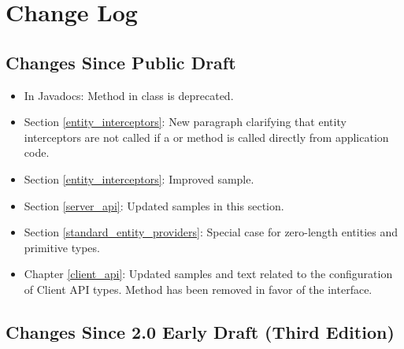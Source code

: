 \chapter{Change Log}

\section{Changes Since Public Draft}

\begin{itemize}
\item In Javadocs: Method  in class  is deprecated.
\item Section \ref{entity_interceptors}: New paragraph clarifying that entity interceptors are not called if a  or  method is called directly from application code.
\item Section \ref{entity_interceptors}: Improved  sample.
\item Section \ref{server_api}: Updated samples in this section.
\item Section \ref{standard_entity_providers}: Special case for zero-length entities and primitive types.
\item Chapter \ref{client_api}: Updated samples and text related to the configuration of Client API types. Method  has been removed in favor of the  interface.
\end{itemize}

\section{Changes Since 2.0 Early Draft (Third Edition)}

